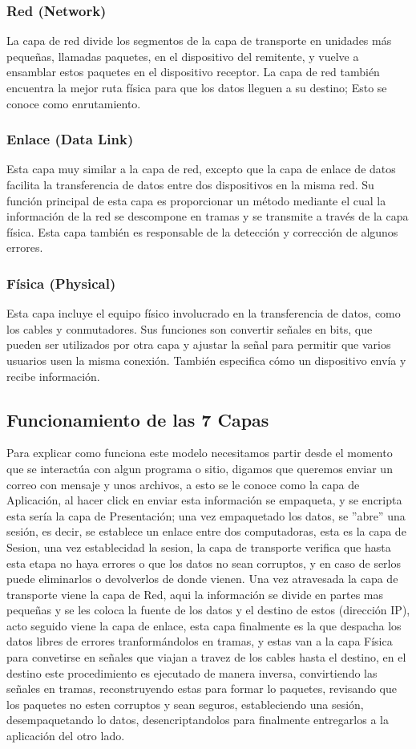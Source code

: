 \subsubsection{Red (Network)}
La capa de red divide los segmentos de la capa de transporte en unidades más pequeñas, llamadas paquetes, en el dispositivo del remitente, y vuelve a ensamblar estos paquetes en el dispositivo receptor. La capa de red también encuentra la mejor ruta física para que los datos lleguen a su destino; Esto se conoce como enrutamiento.
\subsubsection{Enlace (Data Link)}
Esta capa muy similar a la capa de red, excepto que la capa de enlace de datos facilita la transferencia de datos entre dos dispositivos en la misma red. Su función principal de esta capa es proporcionar un método mediante el cual la información de la red se descompone en tramas y se transmite a través de la capa física. Esta capa también es responsable de la detección y corrección de algunos errores.

\subsubsection{Física (Physical)}
Esta capa incluye el equipo físico involucrado en la transferencia de datos, como los cables y conmutadores.
Sus funciones son convertir señales en bits, que pueden ser utilizados por otra capa y ajustar la señal para permitir que varios usuarios usen la misma conexión. También especifica cómo un dispositivo envía y recibe información.
\subsection{Funcionamiento de las 7 Capas}
Para explicar como funciona este modelo necesitamos partir desde el momento que se interactúa con algun programa o sitio, digamos que queremos enviar un correo con mensaje y unos archivos, a esto se le conoce como la capa de Aplicación, al hacer click en enviar esta información se empaqueta, y se encripta esta sería la capa de Presentación; una vez empaquetado los datos, se ''abre'' una sesión, es decir, se establece un enlace entre dos computadoras, esta es la capa de Sesion, una vez establecidad la sesion, la capa de transporte verifica que hasta esta etapa no haya errores o que los datos no sean corruptos, y en caso de serlos puede eliminarlos o devolverlos de donde vienen. Una vez atravesada la capa de transporte viene la capa de Red, aqui la información se divide en partes mas pequeñas y se les coloca la fuente de los datos y el destino de estos (dirección IP), acto seguido viene la capa de enlace, esta capa finalmente es la que despacha los datos libres de errores tranformándolos en tramas, y estas van a la capa Física para convetirse en señales que viajan a travez de los cables hasta el destino, en el destino este procedimiento es ejecutado de manera inversa, convirtiendo las señales en tramas, reconstruyendo estas para formar lo paquetes, revisando que los paquetes no esten corruptos y sean seguros, estableciendo una sesión, desempaquetando lo datos, desencriptandolos para finalmente entregarlos a la aplicación del otro lado.

